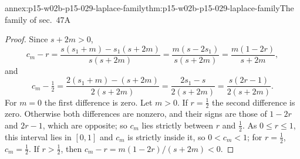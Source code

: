\begin{annexitem}{annex:p15-w02b-p15-029-laplace-family}{thm:p15-w02b-p15-029-laplace-family}{The family of sec.~47A}
\begin{proof}
Since \(s+2m>0\),
\[
 c_m-r=\frac{s(s_1+m)-s_1(s+2m)}{s(s+2m)}=\frac{m(s-2s_1)}{s(s+2m)}
 =\frac{m(1-2r)}{s+2m},
\]
and
\[
 c_m-\tfrac12=\frac{2(s_1+m)-(s+2m)}{2(s+2m)}=\frac{2s_1-s}{2(s+2m)}
 =\frac{s(2r-1)}{2(s+2m)}.
\]
For \(m=0\) the first difference is zero. Let \(m>0\). If
\(r=\tfrac12\) the second difference is zero. Otherwise both
differences are nonzero, and their signs are those of \(1-2r\) and
\(2r-1\), which are opposite; so \(c_m\) lies strictly between \(r\)
and \(\tfrac12\). As \(0\leq r\leq1\), this interval lies in
\([0,1]\) and \(c_m\) is strictly inside it, so \(0<c_m<1\); for
\(r=\tfrac12\), \(c_m=\tfrac12\). If \(r>\tfrac12\), then
\(c_m-r=m(1-2r)/(s+2m)<0\).
\end{proof}
\end{annexitem}

